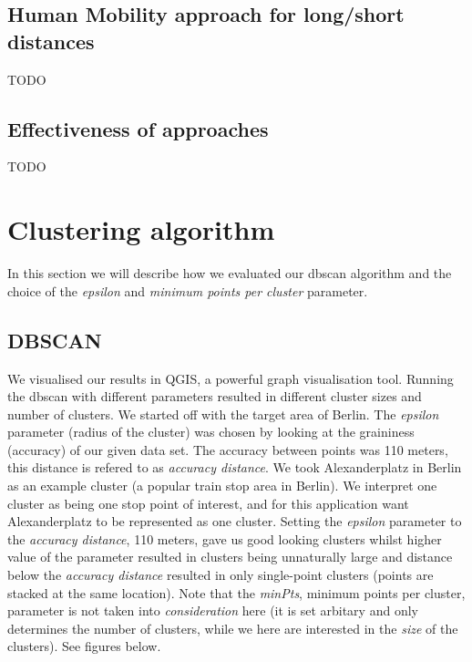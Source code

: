 \subsection{Human Mobility approach for long/short distances}

TODO

\subsection{Effectiveness of approaches}

TODO

\section{Clustering algorithm}

In this section we will describe how we evaluated our dbscan algorithm and the choice of the \textit{epsilon} and \textit{minimum points per cluster} parameter.

\subsection{DBSCAN}

We visualised our results in QGIS, a powerful graph visualisation tool. Running the dbscan with different parameters resulted in different cluster sizes and number of clusters. We started off with the target area of Berlin. The \textit{epsilon} parameter (radius of the cluster) was chosen by looking at the graininess (accuracy) of our given data set. The accuracy between points was 110 meters, this distance is refered to as \textit{accuracy distance}.
We took Alexanderplatz in Berlin as an example cluster (a popular train stop area in Berlin). We interpret one cluster as being one stop point of interest, and for this application want Alexanderplatz to be represented as one cluster. Setting the \textit{epsilon} parameter to the \textit{accuracy distance},  110 meters, gave us good looking clusters whilst higher value of the parameter resulted in clusters being unnaturally large and distance below the \textit{accuracy distance} resulted in only single-point clusters (points are stacked at the same location). Note that the \textit{minPts}, minimum points per cluster, parameter is not taken into \textit{consideration} here (it is set arbitary and only determines the number of clusters, while we here are interested in the \textit{size} of the clusters). See figures below.

